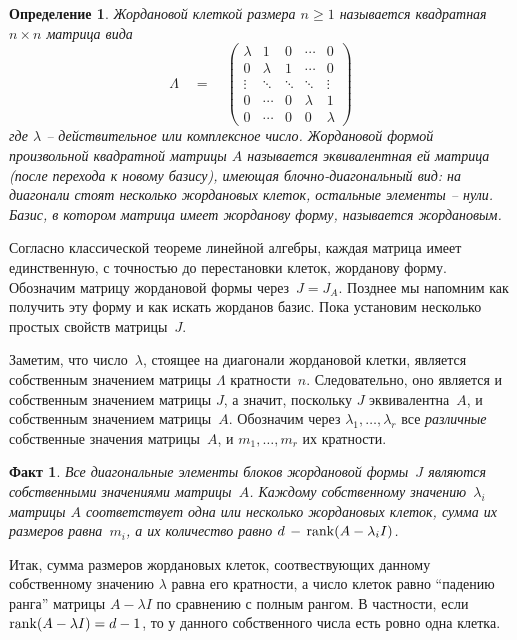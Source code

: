 \documentclass[12pt,a4paper]{article}
\newtheorem{defi}{Определение}
\begin{document}
\begin{defi}\label{d.jor}
Жордановой клеткой размера $n \ge 1$ называется квадратная $n\times n$ матрица вида
\begin{equation}\label{eq.chamb}
\Lambda \quad  = \quad
\left(
\begin{array}{ccccc}
\lambda & 1 & 0  & \cdots & 0\\
0 & \lambda & 1  & \cdots & 0\\
\vdots & \ddots & \ddots & \ddots & \vdots \\
0 & \cdots  & 0 & \lambda & 1\\
0 & \cdots  & 0 & 0 & \lambda
\end{array}
\right)
\end{equation}
где $\lambda$ -- действительное или комплексное число.
Жордановой формой произвольной квадратной матрицы $A$ называется
эквивалентная ей матрица (после перехода к новому базису), имеющая блочно-диагональный вид:
на диагонали стоят несколько жордановых клеток, остальные элементы -- нули. Базис, в котором
матрица имеет жорданову форму, называется жордановым.
\end{defi}
Согласно классической теореме линейной алгебры, каждая матрица имеет единственную, с точностью до перестановки
клеток, жорданову форму. Обозначим матрицу жордановой формы через~$J = J_A$.
 Позднее мы напомним как получить эту форму и как искать жорданов базис.
Пока установим несколько простых свойств матрицы~$J$.

Заметим, что число~$\lambda$, стоящее на диагонали
жордановой клетки, является собственным значением матрицы $\Lambda$ кратности~$n$.
Следовательно, оно является и собственным значением матрицы $J$, а значит, поскольку
$J$ эквивалентна~$A$, и собственным значением матрицы~$A$.
Обозначим через $\lambda_1, \ldots , \lambda_r$ все {\em различные} собственные
значения матрицы~$A$, и $m_1, \ldots , m_r$ их кратности.
\smallskip

\noindent \textbf{Факт 1}. {\em Все диагональные элементы блоков жордановой формы~$J$ являются собственными значениями матрицы~$A$.
Каждому собственному значению~$\lambda_i$ матрицы $A$ соответствует одна или несколько жордановых клеток,
сумма  их размеров равна~$m_i$, а их количество равно $d \, - \, {\rm rank} (A - \lambda_i I)$.}
 \smallskip

Итак, сумма размеров жордановых клеток, соотвествующих данному собственному значению $\lambda$ равна его кратности,
а число клеток равно ``падению ранга'' матрицы $A - \lambda I$ по сравнению с полным рангом.
В частности, если ${\rm rank} (A - \lambda I) = d -1$, то у данного собственного числа есть ровно одна клетка.
\smallskip
\end{document}
